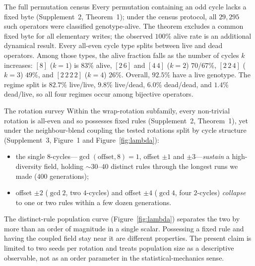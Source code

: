 \begin{empiricalfinding}[label={find:census}]{The full permutation census}
Every permutation containing an odd cycle lacks a fixed byte
(Supplement~2, Theorem~1); under the census protocol, all $29{,}295$ such
operators were classified genotype-alive. The theorem excludes a common fixed
byte for all elementary writes; the observed $100\%$ alive rate is an additional
dynamical result. Every all-even cycle type splits between live and dead
operators. Among those types, the alive fraction falls as the number of cycles
$k$ increases: $[8]$ ($k{=}1$) is $83\%$ alive, $[2\,6]$ and $[4\,4]$ ($k{=}2$)
$70$/$67\%$, $[2\,2\,4]$ ($k{=}3$) $49\%$, and $[2\,2\,2\,2]$ ($k{=}4$) $26\%$.
Overall, $92.5\%$ have a live genotype. The regime split is $82.7\%$ live/live,
$9.8\%$ live/dead, $6.0\%$ dead/dead, and $1.4\%$ dead/live, so all four regimes
occur among bijective operators.
\end{empiricalfinding}

\begin{empiricalfinding}[label={find:survey}]{The rotation survey}
Within the wrap-rotation subfamily, every non-trivial rotation is all-even and
so possesses fixed rules (Supplement~2, Theorem~1), yet under the
neighbour-blend coupling the tested rotations split by cycle structure
(Supplement~3, Figure~1 and Figure~\ref{fig:lambda}):
\begin{itemize}\setlength{\itemsep}{1pt}
\item the single 8-cycles---$\gcd(\text{offset},8)=1$, offset $\pm 1$ and
$\pm 3$---\emph{sustain} a high-diversity field, holding $\sim$30--40 distinct
rules through the longest runs we made ($400$ generations);
\item offset $\pm 2$ ($\gcd 2$, two $4$-cycles) and offset $\pm 4$ ($\gcd 4$,
four $2$-cycles) \emph{collapse} to one or two rules within a few dozen
generations.
\end{itemize}
The distinct-rule population curve (Figure~\ref{fig:lambda}) separates the two by
more than an order of magnitude in a single scalar. Possessing a fixed rule and
having the coupled field stay near it are different properties. The present
claim is limited to two seeds per rotation and treats population size as a
descriptive observable, not as an order parameter in the statistical-mechanics
sense.
\end{empiricalfinding}

